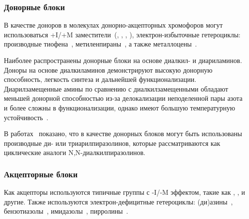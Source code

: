 \subsubsection{Донорные блоки}
В качестве доноров в молекулах донорно-акцепторных хромофоров могут использоваться +I/+M заместители~(, , , ), электрон-избыточные гетероциклы: производные тиофена~\cite{doi:10.1002/9780470745533.ch1}, метиленпираны~\cite{Gauthier2013}, а также металлоцены~\cite{Long1995,Salman2013}.

Наиболее распространены донорные блоки на основе диалкил- и диариламинов. 
Доноры на основе диалкиламинов демонстрируют высокую донорную способность, легкость синтеза и дальнейшей функционализации. 
Диарилзамещенные амины по сравнению с диалкилзамещенными обладают меньшей донорной способностью из-за делокализации неподеленной пары азота и более сложны в функционализации, однако имеют большую температурную устойчивость~\cite{Dalton2010a}.

В работах~\cite{2019, Shelkovnikov2019} показано, что в качестве донорных блоков могут быть использованы производные ди- или триарилпиразолинов, которые рассматриваются как циклические аналоги N,N-диалкилпиразолинов.

\subsubsection{Акцепторные блоки}
Как акцепторы используются типичные группы с -I/-M эффектом, такие как , ,  и другие. Также используются электрон-дефицитные гетероциклы: (ди)азины~\cite{Achelle2013}, бензотиазолы~\cite{Hrobarik2011}, имидазолы~\cite{Kulhanek2012}, пирролины~\cite{Jang2006}.



